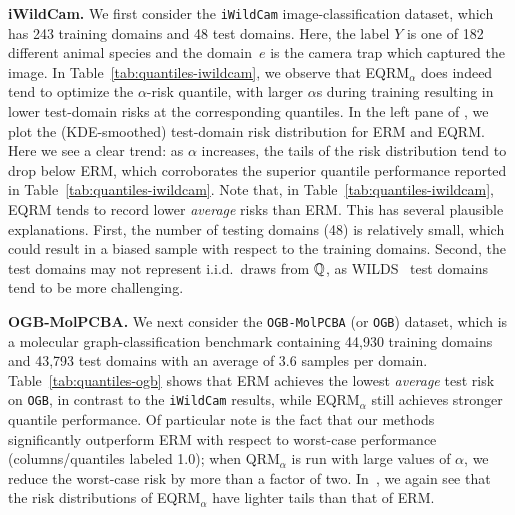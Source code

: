 \documentclass{article}
\begin{document}
\textbf{iWildCam.} We first consider the \texttt{iWildCam} image-classification dataset, which has 243 training domains and 48 test domains. Here, the label $Y$ is one of 182 different animal species and the domain~$e$ is the camera trap which captured the image.
%
In Table~\ref{tab:quantiles-iwildcam}, we observe that EQRM$_\alpha$ does indeed tend to optimize the $\alpha$-risk quantile, 
with larger $\alpha$s during training resulting in lower test-domain risks at the corresponding quantiles.
%
In the left pane of , we plot the (KDE-smoothed) test-domain risk distribution for ERM and EQRM.  Here we see a clear trend: as $\alpha$ increases, the tails of the risk distribution tend to drop below ERM, which corroborates the superior quantile performance reported in Table~\ref{tab:quantiles-iwildcam}.
%
Note that, in Table~\ref{tab:quantiles-iwildcam}, EQRM tends to record lower \textit{average} risks than ERM.  This
%
has several plausible explanations. First, the number of testing domains (48) is relatively small, which could result in a biased sample with respect to the training domains.  Second, the test domains may not represent i.i.d.\ draws from $\mathbb{Q}$, as WILDS~\citep{wilds2021} test domains tend to be more challenging.


\textbf{OGB-MolPCBA.} We next consider the \texttt{OGB-MolPCBA} (or \texttt{OGB}) dataset, which is a molecular graph-classification benchmark containing 44,930 training domains and 43,793 test domains with an average of $3.6$ samples per domain.  
%
Table~\ref{tab:quantiles-ogb} shows that ERM achieves the lowest \emph{average} test risk on \texttt{OGB},
in contrast to the \texttt{iWildCam} results,
%
while EQRM$_\alpha$ still achieves stronger quantile performance.
%
Of particular note is the fact that our methods significantly outperform ERM with respect to worst-case performance (columns/quantiles labeled 1.0); when QRM$_\alpha$ is run with large values of $\alpha$, we reduce the worst-case risk by more than a factor of two.   In~, we again see that the risk distributions of EQRM$_\alpha$ have lighter tails than that of ERM.
\end{document}
